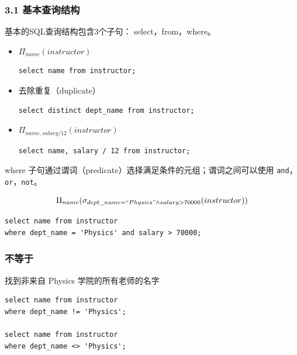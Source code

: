\documentclass[aspectratio=169, 14pt]{beamer}
\begin{document}
\begin{frame}[fragile]
    \frametitle{3.1 基本查询结构}
    基本的SQL查询结构包含3个子句： \alert{select}，\alert{from}，\alert{where}。

\begin{itemize}
    \item<1-> \(\Pi_{name}(instructor)\)
    \begin{verbatim}
select name from instructor;
    \end{verbatim}
    \item<2-> 去除重复（duplicate）
\begin{verbatim}
select distinct dept_name from instructor;
\end{verbatim}
    \item<3-> \(\Pi_{name, salary/12}(instructor)\)
\begin{verbatim}
select name, salary / 12 from instructor;
\end{verbatim}    
\end{itemize}
\end{frame}

\begin{frame}[fragile]
    \alert{where} 子句通过谓词（predicate）选择满足条件的元组；谓词之间可以使用 \texttt{and}，\texttt{or}，\texttt{not}。

    \[\Pi_{name}(\sigma_{dept\_name=``Physics" \land salary > 70000}(instructor))\]  
    \begin{verbatim}
select name from instructor 
where dept_name = 'Physics' and salary > 70000;
    \end{verbatim} 
    \pause  
\end{frame}

\begin{frame}[fragile]
    \frametitle{不等于}
找到非来自 Physics 学院的所有老师的名字

\begin{verbatim}
select name from instructor 
where dept_name != 'Physics';

select name from instructor 
where dept_name <> 'Physics';
\end{verbatim} 


\end{frame}
\end{document}
